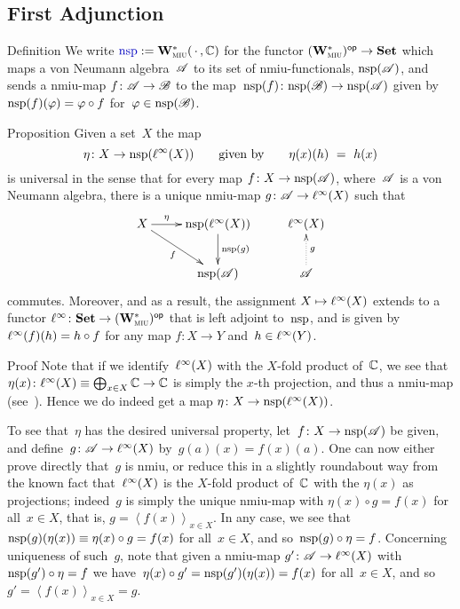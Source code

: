 \documentclass[a]{subfiles}
\begin{document}
\subsection{First Adjunction}
\begin{parsec}%
\begin{point}{Definition}%
We write $\Define{\nsp}:=\W{miu}(\,\cdot\,,\C)$
for the functor ${(\mathbf{W}^*_{\text{\textsc{miu}}})}{^{\mathsf{op}}}\to \mathbf{Set}$
which maps a von Neumann algebra~$\mathscr{A}$
to its set
of nmiu-functionals,
$\mathrm{nsp}(\mathscr{A})$,
and sends a nmiu-map $f\colon \mathscr{A}\to\mathscr{B}$
to the map~$\mathrm{nsp}(f)\colon \mathrm{nsp}(\mathscr{B})\to\mathrm{nsp}(\mathscr{A})$
given by~$\mathrm{nsp}(f)(\varphi)=\varphi \circ f$
for~$\varphi \in \mathrm{nsp}(\mathscr{B})$.
\end{point}
\begin{point}{Proposition}%
Given a set~$X$
the map
\begin{equation*}
\eta\colon X\to\mathrm{nsp}(\ell^\infty(X))
\qquad\text{given by}\qquad
	\eta(x)(h)\ =\ h(x)
\end{equation*}
is universal
in the sense that for every 
map $f\colon X\to\mathrm{nsp}(\mathscr{A})$,
where~$\mathscr{A}$ is a von Neumann algebra,
there is a unique
nmiu-map $g\colon \mathscr{A}\to\ell^\infty(X)$
such that
\begin{equation*}%
\xymatrix{%
X
\ar[r]^-\eta
\ar[rd]_-f
&
\nsp(\linf(X))
\ar[d]^-{\nsp(g)}
&
\linf(X)
\\
&
\nsp(\scrA)
&
\scrA
\ar@{.>}[u]_-g
}
\end{equation*}
commutes.
Moreover, and as a result, the assignment
$X\mapsto \ell^\infty(X)$
extends to a functor
$\ell^\infty\colon \mathbf{Set}\to{(\mathbf{W}^*_{\text{\textsc{miu}}})}{^{\mathsf{op}}}$
that is left adjoint
to~$\mathrm{nsp}$,
and is given by $\ell^\infty(f)(h) = h\circ f$
for any map $f\colon X\to Y$
and~$h\in \ell^\infty(Y)$.
\begin{point}{Proof}%
Note that if we identify~$\ell^\infty(X)$
with the $X$-fold product of~$\mathbb{C}$,
we see that~$\eta(x)\colon \ell^\infty(X)\equiv \bigoplus_{x\in X}\mathbb{C}\to \mathbb{C}$
is simply the $x$-th projection,
and thus a nmiu-map (see~).
Hence we do indeed get a map $\eta\colon X\to\mathrm{nsp}(\ell^\infty(X))$.

To see that~$\eta$ has the desired universal property,
let~$f\colon X\to\mathrm{nsp}(\mathscr{A})$ be given,
and define~$g\colon \mathscr{A}\to \ell^\infty(X)$
by~$g(a)(x)=f(x)(a)$.
One can now either prove directly that~$g$ is nmiu,
or reduce this in a slightly roundabout way
from the known fact that~$\ell^\infty(X)$ is the 
$X$-fold product of~$\mathbb{C}$ with the $\eta(x)$ as projections;
indeed~$g$ is simply the  unique nmiu-map with $\eta(x)\circ g = f(x)$
for all~$x\in X$, that is,  $g=\left<f(x)\right>_{x\in X}$.
In any case,
we see that $\mathrm{nsp}(g)(\eta(x)) \equiv \eta(x)\circ g = f(x)$
for all~$x\in X$, and so~$\mathrm{nsp}(g) \circ \eta = f$.
Concerning uniqueness of such~$g$,
note that given a nmiu-map $g'\colon \mathscr{A}\to\ell^\infty(X)$
with~$\mathrm{nsp}(g')\circ \eta = f$
we have~$\eta(x)\circ  g'= \mathrm{nsp}(g')(\eta(x))
= f(x)$ for all~$x\in X$,
and so~$g'=\left<f(x)\right>_{x\in X}=g$.


\end{point}
\end{point}
\end{parsec}
\end{document}
